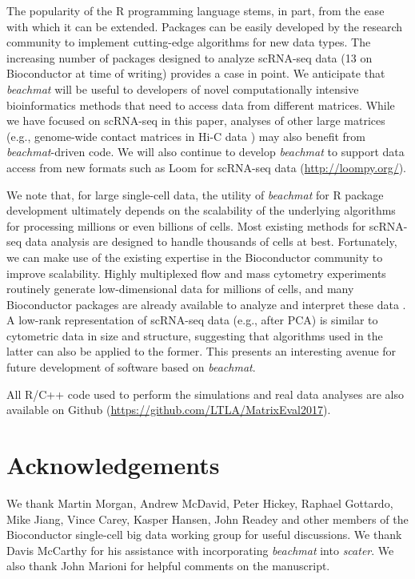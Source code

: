 \documentclass[10pt,letterpaper]{article}
\newcommand{\beachmat}{\textit{beachmat}}
\begin{document}
The popularity of the R programming language stems, in part, from the ease with which it can be extended.
Packages can be easily developed by the research community to implement cutting-edge algorithms for new data types.
The increasing number of packages designed to analyze scRNA-seq data (13 on Bioconductor at time of writing) provides a case in point.
We anticipate that \beachmat{} will be useful to developers of novel computationally intensive bioinformatics methods that need to access data from different matrices.
While we have focused on scRNA-seq in this paper, analyses of other large matrices (e.g., genome-wide contact matrices in Hi-C data \cite{lun2016infrastructure}) may also benefit from \beachmat{}-driven code.
We will also continue to develop \beachmat{} to support data access from new formats such as Loom for scRNA-seq data (\url{http://loompy.org/}).

We note that, for large single-cell data, the utility of \beachmat{} for R package development ultimately depends on the scalability of the underlying algorithms for processing millions or even billions of cells.
Most existing methods for scRNA-seq data analysis are designed to handle thousands of cells at best.
Fortunately, we can make use of the existing expertise in the Bioconductor community to improve scalability.
Highly multiplexed flow and mass cytometry experiments routinely generate low-dimensional data for millions of cells,
and many Bioconductor packages are already available to analyze and interpret these data \cite{finak2014opencyto,weber2016comparison,lun2017testing}.
A low-rank representation of scRNA-seq data (e.g., after PCA) is similar to cytometric data in size and structure, suggesting that algorithms used in the latter can also be applied to the former.
This presents an interesting avenue for future development of software based on \beachmat{}.

All R/C++ code used to perform the simulations and real data analyses are also available on Github (\url{https://github.com/LTLA/MatrixEval2017}).

\section*{Acknowledgements}
We thank Martin Morgan, Andrew McDavid, Peter Hickey, Raphael Gottardo, Mike Jiang, Vince Carey, Kasper Hansen, John Readey and other members of the Bioconductor single-cell big data working group for useful discussions.
We thank Davis McCarthy for his assistance with incorporating \beachmat{} into \textit{scater}.
We also thank John Marioni for helpful comments on the manuscript.
\end{document}
